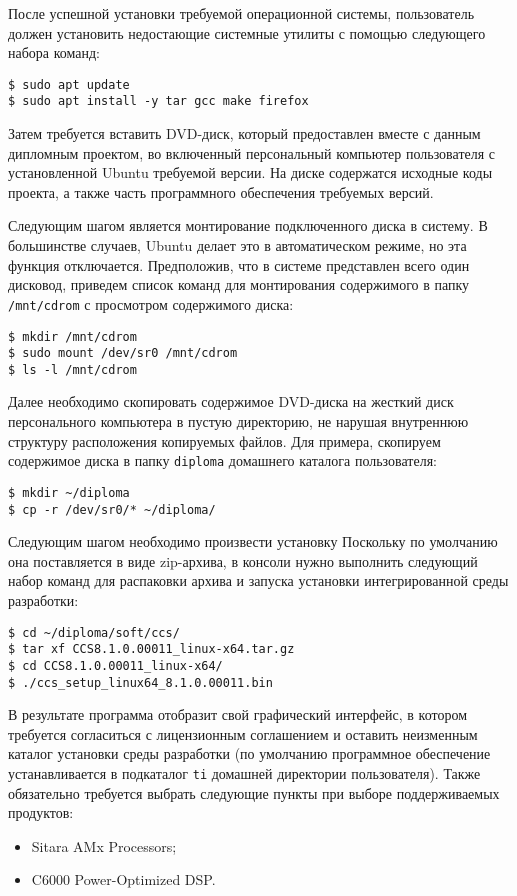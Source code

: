 После успешной установки требуемой операционной системы, пользователь должен
установить недостающие системные утилиты с помощью следующего набора команд:
\begin{lstlisting}
$ sudo apt update
$ sudo apt install -y tar gcc make firefox
\end{lstlisting}

Затем требуется вставить
DVD-диск, который предоставлен вместе с данным дипломным проектом, во включенный
персональный компьютер пользователя с установленной Ubuntu требуемой версии.
На диске содержатся исходные коды проекта, а также часть программного обеспечения
требуемых версий.

Следующим шагом является монтирование подключенного диска в систему.
В большинстве случаев, Ubuntu делает это в автоматическом режиме, но эта
функция отключается. Предположив, что в системе представлен всего
один дисковод, приведем список команд для монтирования содержимого
в папку \lstinline{/mnt/cdrom} с просмотром содержимого диска:
\begin{lstlisting}
$ mkdir /mnt/cdrom
$ sudo mount /dev/sr0 /mnt/cdrom
$ ls -l /mnt/cdrom
\end{lstlisting}

Далее необходимо скопировать содержимое DVD-диска на жесткий диск
персонального компьютера в пустую директорию, не нарушая внутреннюю структуру
расположения копируемых файлов. Для примера, скопируем содержимое диска в папку
\lstinline{diploma} домашнего каталога пользователя:
\begin{lstlisting}
$ mkdir ~/diploma
$ cp -r /dev/sr0/* ~/diploma/
\end{lstlisting}

Следующим шагом необходимо произвести установку Поскольку
по умолчанию она поставляется в виде zip-архива, в консоли нужно выполнить
следующий набор команд для распаковки архива и запуска установки интегрированной
среды разработки:
\begin{lstlisting}
$ cd ~/diploma/soft/ccs/
$ tar xf CCS8.1.0.00011_linux-x64.tar.gz
$ cd CCS8.1.0.00011_linux-x64/
$ ./ccs_setup_linux64_8.1.0.00011.bin
\end{lstlisting}

В результате программа отобразит свой графический интерфейс, в котором требуется
согласиться с лицензионным соглашением и оставить неизменным каталог установки
среды разработки (по умолчанию программное обеспечение устанавливается в
подкаталог \lstinline{ti} домашней директории пользователя). Также обязательно требуется
выбрать следующие пункты при выборе поддерживаемых продуктов:
\begin{itemize}
    \item Sitara\texttrademark{} AMx Processors;
    \item C6000 Power-Optimized DSP.
\end{itemize}

